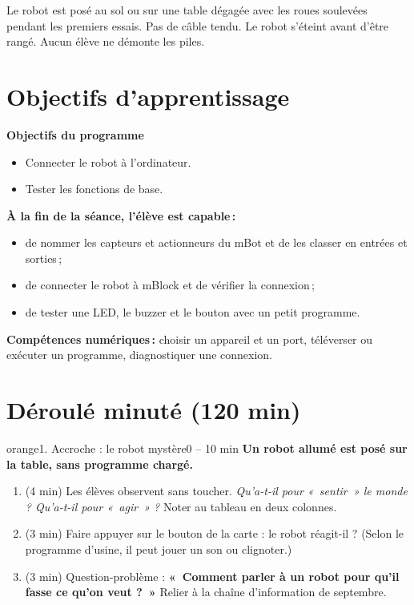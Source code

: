 \documentclass[11pt,a4paper]{article}
\begin{document}
\begin{astuce}
Le robot est posé au sol ou sur une table dégagée avec les roues soulevées pendant les premiers essais. Pas de câble tendu. Le robot s'éteint avant d'être rangé. Aucun élève ne démonte les piles.
\end{astuce}

\section{Objectifs d'apprentissage}
\begin{tcolorbox}[colback=gray!8,colframe=gray!60!black,arc=1mm,boxrule=0.5pt]
\textbf{Objectifs du programme}
\begin{itemize}
 \item Connecter le robot à l'ordinateur.
 \item Tester les fonctions de base.
\end{itemize}
\textbf{À la fin de la séance, l'élève est capable\,:}
\begin{itemize}
 \item de nommer les capteurs et actionneurs du mBot et de les classer en entrées et sorties\,;
 \item de connecter le robot à mBlock et de vérifier la connexion\,;
 \item de tester une LED, le buzzer et le bouton avec un petit programme.
\end{itemize}
\textbf{Compétences numériques\,:} choisir un appareil et un port, téléverser ou exécuter un programme, diagnostiquer une connexion.
\end{tcolorbox}

\section{Déroulé minuté (120 min)}

\begin{etape}{orange}{1. Accroche : le robot mystère}{0 -- 10 min}
\textbf{Un robot allumé est posé sur la table, sans programme chargé.}
\begin{enumerate}
 \item (4 min) Les élèves observent sans toucher. \emph{Qu'a-t-il pour «~sentir~» le monde ? Qu'a-t-il pour «~agir~» ?} Noter au tableau en deux colonnes.
 \item (3 min) Faire appuyer sur le bouton de la carte : le robot réagit-il ? (Selon le programme d'usine, il peut jouer un son ou clignoter.)
 \item (3 min) Question-problème : \textbf{«~Comment parler à un robot pour qu'il fasse ce qu'on veut ?~»} Relier à la chaîne d'information de septembre.
\end{enumerate}
\end{etape}
\end{document}
